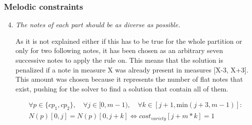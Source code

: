 \subsubsection{Melodic constraints}
\begin{enumerate}[wide, label=\bfseries 1.M\arabic*]
\setcounter{enumi}{3} %
    \item\label{constraint:variety} \reddot \textit{The notes of each part should be as diverse as possible.}

    As it is not explained either if this has to be true for the whole partition or only for two following notes, it has been chosen as an arbitrary seven successive notes to apply the rule on. This means that the solution is penalized if a note in measure X was already present in measures [X-3, X+3]. This amount was chosen because it represents the number of flat notes that exist, pushing for the solver to find a solution that contain all of them.

    \begin{equation} \begin{aligned}
    &\forall p \in \{cp_1, cp_2\}, \quad \forall j \in [0, m-1), \quad \forall k \in [j+1, \text{min} (j+3, m-1)] :\\ 
    &N(p)[0, j] = N(p)[0, j+k]\iff cost_{variety}[j+m*k]= 1
    \end{aligned} \end{equation}
\end{enumerate}

